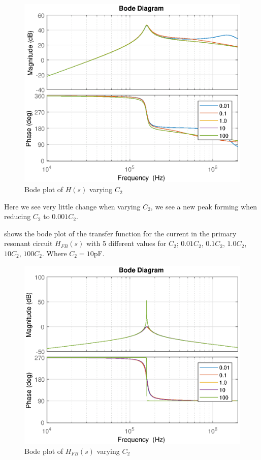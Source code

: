 \begin{figure}[H]
    \centering
    \includegraphics[width=\textwidth]{img/CoilRigBode_C2.eps}
    \caption{Bode plot of $H(s)$ varying $C_2$}
    \label{fig:bode_c2}
\end{figure}

Here we see very little change when varying $C_2$, we see a new peak forming when reducing $C_2$ to $0.001 C_2$.

 shows the bode plot of the transfer function for the current in the primary resonant circuit $H_{FB}(s)$ with 5 different values for $C_2$; $0.01C_2$, $0.1C_2$, $1.0C_2$, $10C_2$, $100C_2$.  Where $C_2 = 10$pF.
\begin{figure}[H]
    \centering
    \includegraphics[width=\textwidth]{img/FeedBackBode_C2.eps}
    \caption{Bode plot of $H_{FB}(s)$ varying $C_2$}
    \label{fig:fbbode_c2}
\end{figure}

